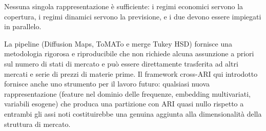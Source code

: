 \documentclass[12pt]{article}
\begin{document}
Nessuna singola rappresentazione è sufficiente: i regimi economici servono la copertura, i regimi dinamici servono la previsione, e i due devono essere impiegati in parallelo.

La pipeline (Diffusion Maps, ToMATo e merge Tukey HSD) fornisce una metodologia rigorosa e riproducibile che non richiede alcuna assunzione a priori sul numero di stati di mercato e può essere direttamente trasferita ad altri mercati e serie di prezzi di materie prime.
Il framework cross-ARI qui introdotto fornisce anche uno strumento per il lavoro futuro: qualsiasi nuova rappresentazione (feature nel dominio delle frequenze, embedding multivariati, variabili esogene) che produca una partizione con ARI quasi nullo rispetto a entrambi gli assi noti costituirebbe una genuina aggiunta alla dimensionalità della struttura di mercato.



\end{document}

